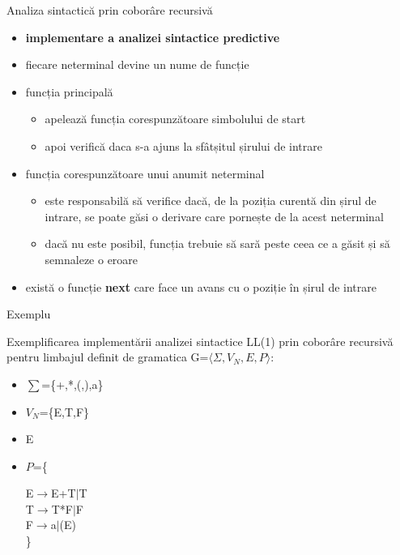 \documentclass[pdf]{beamer}
\begin{document}
\begin{frame}{Analiza sintactică prin coborâre recursivă}
\begin{itemize}
\item \textbf{implementare a analizei sintactice predictive}

\item 
fiecare neterminal devine un nume de funcție

\item 
funcția principală
\begin{itemize}
\item
apelează funcția corespunzătoare simbolului de start
\item
apoi verifică daca s-a ajuns la sfâtșitul șirului de intrare
\end{itemize}

\item 
funcția corespunzătoare unui anumit neterminal
\begin{itemize}
\item
este responsabilă să verifice dacă, de la poziția curentă din șirul de intrare, se poate găsi o derivare care pornește de la acest neterminal
\item 
dacă nu este posibil, funcția trebuie să sară peste ceea ce a găsit și să semnaleze o eroare
\end{itemize}

\item
există o funcție \textbf{next} care face un avans cu o poziție în șirul de intrare
\end{itemize}
\end{frame}



\begin{frame}{Exemplu}

Exemplificarea implementării analizei sintactice LL(1) prin coborâre recursivă pentru limbajul definit de gramatica G=$\langle \Sigma, V_N, E, P \rangle$:

\begin{itemize}
\item
$\sum$=\{+,*,(,),a\}
\item
$V_N$=\{E,T,F\}
\item
E
\item
$P$=\{

\hspace{1cm} E$\to$E+T$\mid$T\\
\hspace{1cm} T$\to$T*F$\mid$F\\
\hspace{1cm} F$\to$a$\mid$(E)\\
\}
\end{itemize}

\end{frame}
\end{document}
